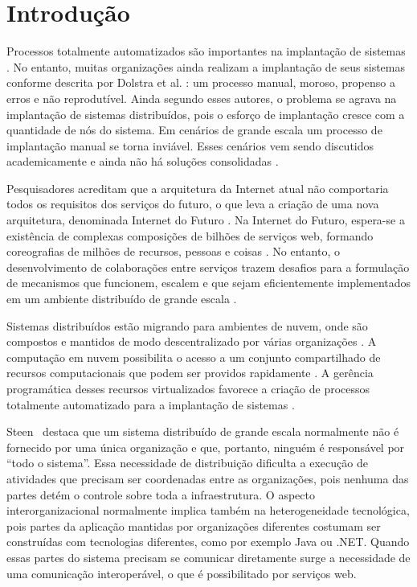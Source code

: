 \chapter{Introdução}
\label{cap:introducao}

Processos totalmente automatizados são importantes na implantação de sistemas \cite{Humble2011Continuous}. No entanto, muitas organizações ainda realizam a implantação de seus sistemas conforme descrita por Dolstra et al. \cite{Dolstra2005Configuration}: um processo manual, moroso, propenso a erros e não reprodutível. Ainda segundo esses autores, o problema se agrava na implantação de sistemas distribuídos, pois o esforço de implantação cresce com a quantidade de nós do sistema. Em cenários de grande escala um processo de implantação manual se torna inviável. Esses cenários vem sendo discutidos academicamente e ainda não há soluções consolidadas \cite{Valerie2011FutureInternet}.

Pesquisadores acreditam que a arquitetura da Internet atual não comportaria todos os requisitos dos serviços do futuro, o que leva a criação de uma nova arquitetura, denominada Internet do Futuro \cite{Zahariadis2011FutureInternet}. Na Internet do Futuro, espera-se a existência de complexas composições de bilhões de serviços web, formando coreografias de milhões de recursos, pessoas e coisas \cite{Valerie2011FutureInternet}. No entanto, o desenvolvimento de colaborações entre serviços trazem desafios para a formulação de mecanismos que funcionem, escalem e que sejam eficientemente implementados em um ambiente distribuído de grande escala \cite{Steen2011VeryLarge}.

Sistemas distribuídos estão migrando para ambientes de nuvem, onde são compostos e mantidos de modo descentralizado por várias organizações \cite{Steen2011VeryLarge}. A computação em nuvem possibilita o acesso a um conjunto compartilhado de recursos computacionais que podem ser providos rapidamente \cite{Nist2011Cloud}. A gerência programática desses recursos virtualizados favorece a criação de processos totalmente automatizado para a implantação de sistemas \cite{Humble2011Continuous}.   

Steen~\cite{Steen2011VeryLarge} destaca que um sistema distribuído de grande escala normalmente não é fornecido por uma única organização e que, portanto, ninguém é responsável por ``todo o sistema''. Essa necessidade de distribuição dificulta a execução de atividades que precisam ser coordenadas entre as organizações, pois nenhuma das partes detém o controle sobre toda a infraestrutura. O aspecto interorganizacional normalmente implica também na heterogeneidade tecnológica, pois partes da aplicação mantidas por organizações diferentes costumam ser construídas com tecnologias diferentes, como por exemplo Java ou .NET. Quando essas partes do sistema precisam se comunicar diretamente surge a necessidade de uma comunicação interoperável, o que é possibilitado por serviços web. 


